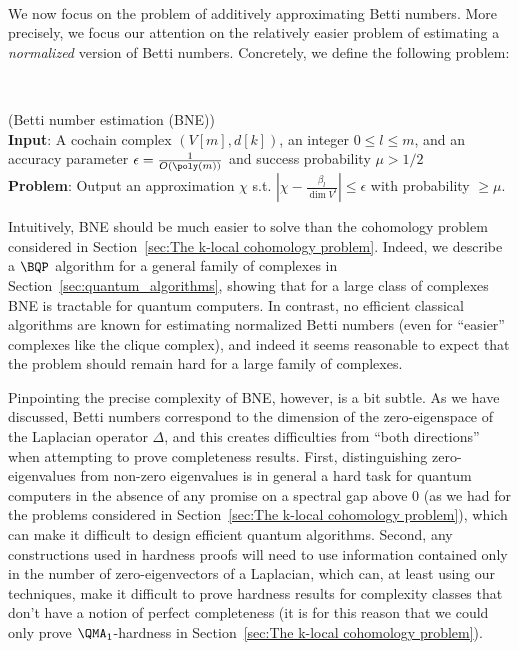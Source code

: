 \documentclass[11pt]{article}
\numberwithin{equation}{section}
\renewcommand\( {\left(}
\renewcommand\) {\right)}
\newcounter{mycount}
\newcommand\myprob[3]{%
   \stepcounter{mycount}
 \par\noindent   {\bfseries Definition\  \themycount} (#1)\\
   {\bfseries Input}: #2\\
   {\bfseries Problem}: #3\par
}
\begin{document}
\ 

\noindent We now focus on the problem of additively approximating Betti numbers. More precisely, we focus our attention on the relatively easier problem of estimating a \emph{normalized} version of Betti numbers. Concretely, we define the following problem:

\ 

\myprob{\label{def:bne}{\sc Betti number estimation (BNE)}}{A cochain complex $(V[m],d[k])$, an integer $0\leq l \leq m$, and an accuracy parameter $\epsilon = \frac{1}{O(\poly(m))}$ and success probability $\mu > 1/2$}{Output an approximation $\chi$ s.t. $\left|\chi - \frac{\beta_l}{\dim{V^l}} \right| \leq \epsilon$ with probability $\geq \mu$.\\}



\noindent Intuitively, {\sc BNE} should be much easier to solve than the cohomology problem considered in Section~\ref{sec:The k-local cohomology problem}. Indeed,  we describe a $\BQP$ algorithm for a general family of complexes in Section~\ref{sec:quantum_algorithms}, showing that for a large class of complexes {\sc BNE} is  tractable for quantum computers. In contrast, no efficient classical algorithms are known for estimating normalized Betti numbers (even for ``easier'' complexes like the clique complex), and indeed it seems reasonable to expect that the problem should remain hard for a large family of complexes. 

Pinpointing the precise complexity of {\sc BNE}, however, is a bit subtle. As we have discussed, Betti numbers correspond to the dimension of the zero-eigenspace of the Laplacian operator $\Delta$, and this creates difficulties from ``both directions'' when attempting to prove completeness results. First, distinguishing zero-eigenvalues from non-zero eigenvalues is in general a hard task for quantum computers in the absence of any promise on a spectral gap above 0 (as we had for the problems considered in Section~\ref{sec:The k-local cohomology problem}), which can make it difficult to design efficient quantum algorithms. Second, any constructions used in hardness proofs will need to use information contained only in the number of zero-eigenvectors of a Laplacian, which can, at least using our techniques, make it difficult to prove hardness results for complexity classes that don't have a notion of perfect completeness (it is for this reason that we could only prove $\QMA_1$-hardness in Section~\ref{sec:The k-local cohomology problem}). 
\end{document}
